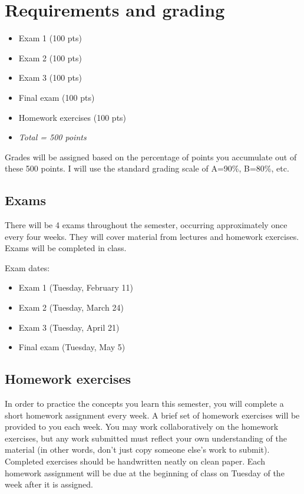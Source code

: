 \documentclass[10pt]{article}
\begin{document}
\section*{Requirements and grading}
\label{sec:orgfd8ff8e}
\begin{itemize}
\item Exam 1 (100 pts)
\item Exam 2 (100 pts)
\item Exam 3 (100 pts)
\item Final exam (100 pts)
\item Homework exercises (100 pts)
\item \emph{Total = 500 points}
\end{itemize}

Grades will be assigned based on the percentage of points you accumulate out of these 500 points.  I will use the standard grading scale of A=90\%, B=80\%, etc.

\subsection*{Exams}
\label{sec:org50c798c}
There will be 4 exams throughout the semester, occurring approximately once every four weeks.  They will cover material from lectures and homework exercises. Exams will be completed in class.

Exam dates:

\begin{itemize}
\item Exam 1 (Tuesday, February 11)
\item Exam 2 (Tuesday, March 24)
\item Exam 3 (Tuesday, April 21)
\item Final exam (Tuesday, May 5)
\end{itemize}

\subsection*{Homework exercises}
\label{sec:orgcc1e1d2}
In order to practice the concepts you learn this semester, you will complete a short homework assignment every week. A brief set of homework exercises will be provided to you each week. You may work collaboratively on the homework exercises, but any work submitted must reflect your own understanding of the material (in other words, don't just copy someone else's work to submit). Completed exercises should be handwritten neatly on clean paper. Each homework assignment will be due at the beginning of class on Tuesday of the week after it is assigned.
\end{document}
